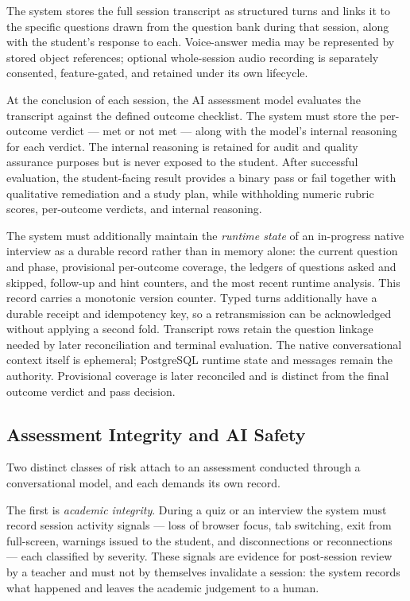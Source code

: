 The system stores the full session transcript as structured turns and
links it to the specific questions drawn from the question bank during
that session, along with the student's response to each. Voice-answer
media may be represented by stored object references; optional
whole-session audio recording is separately consented, feature-gated,
and retained under its own lifecycle.

At the conclusion of each session, the AI assessment model evaluates 
the transcript against the defined outcome checklist. The system must 
store the per-outcome verdict — met or not met — along with the 
model's internal reasoning for each verdict. The internal reasoning 
is retained for audit and quality assurance purposes but is never
exposed to the student. After successful evaluation, the student-facing
result provides a binary pass or fail together with qualitative
remediation and a study plan, while withholding numeric rubric scores,
per-outcome verdicts, and internal reasoning.

The system must additionally maintain the \textit{runtime state} of an
in-progress native interview as a durable record rather than in
memory alone: the current question and phase, provisional per-outcome
coverage, the ledgers of questions asked and skipped, follow-up and
hint counters, and the most recent runtime analysis. This record
carries a monotonic version counter. Typed turns additionally have a
durable receipt and idempotency key, so a retransmission can be
acknowledged without applying a second fold. Transcript rows retain
the question linkage needed by later reconciliation and terminal
evaluation. The native conversational context itself is ephemeral;
PostgreSQL runtime state and messages remain the authority. Provisional
coverage is later reconciled and is distinct from the final outcome
verdict and pass decision.

\subsection{Assessment Integrity and AI Safety}

Two distinct classes of risk attach to an assessment conducted through
a conversational model, and each demands its own record.

The first is \textit{academic integrity}. During a quiz or an
interview the system must record session activity signals — loss of
browser focus, tab switching, exit from full-screen, warnings issued
to the student, and disconnections or reconnections — each classified
by severity. These signals are evidence for post-session review by a
teacher and must not by themselves invalidate a session: the system
records what happened and leaves the academic judgement to a human.

